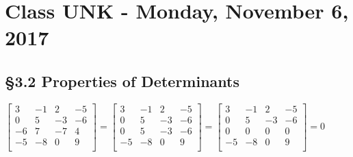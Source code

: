\chapter{Class UNK - Monday, November 6, 2017}
\section{\S 3.2 Properties of Determinants}
\begin{ex}
$\begin{bmatrix}
3 & -1 & 2 & -5\\
0 & 5 & -3 & -6\\
-6 & 7 & -7 &4\\
-5& -8&0 &9\\
\end{bmatrix} = \begin{bmatrix}
3 & -1 & 2 & -5\\
0 & 5 & -3 & -6\\
0 & 5 & -3 &-6\\
-5& -8&0 &9\\
\end{bmatrix} = \begin{bmatrix}
3 & -1 & 2 & -5\\
0 & 5 & -3 & -6\\
0 & 0 & 0 &0\\
-5& -8&0 &9\\
\end{bmatrix} =0$
\end{ex}
